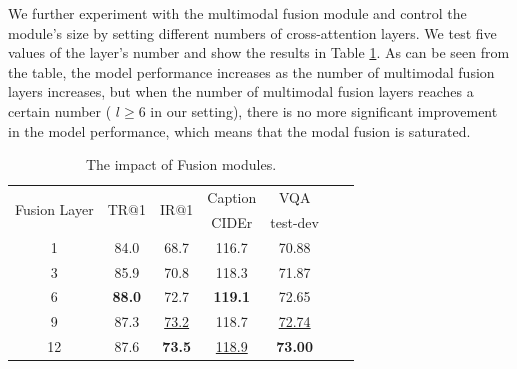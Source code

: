 \documentclass[10pt,twocolumn,letterpaper]{article}
\begin{document}
We further experiment with the multimodal fusion module and control the module's size by setting different numbers of cross-attention layers. 
We test five values of the layer's number and show the results in Table \ref{abl_fusion}. 
As can be seen from the table, the model performance increases as the number of multimodal fusion layers increases, but when the number of multimodal fusion layers reaches a certain number ( $ l \geq 6 $ in our setting), there is no more significant improvement in the model performance, which means that the modal fusion is saturated. 

\begin{center}
\end{center}


\begin{table}[t]
  \caption{The impact of Fusion modules.}
  \label{abl_fusion}
    \vspace{10.0pt}
  \begin{center}
  \begin{small}
  \renewcommand\arraystretch{1.2}
  \setlength{\tabcolsep}{2.2mm}
   \begin{tabular}{c|cccccc}
    \toprule 
    \multirow{2}{1.6cm}{\centering Fusion Layer}  &  \multirow{2}{0.7cm}{TR$@$1}  & \multirow{2}{0.7cm}{IR$@$1}  &  \multicolumn{1}{c}{Caption} & \multicolumn{1}{c}{VQA} \\
      &  & & CIDEr & test-dev   \\
    \midrule
    1     &  84.0 & 68.7 & 116.7 & 70.88  \\
    3     &  85.9 & 70.8 & 118.3 & 71.87  \\
    6     &  \textbf{88.0} & 72.7 & \textbf{119.1} & 72.65  \\
    9     &  87.3 & \underline{73.2} & 118.7 & \underline{72.74}  \\
    12    &  87.6 & \textbf{73.5} & \underline{118.9} & \textbf{73.00}  \\
  \bottomrule
  \end{tabular}
  \end{small}
  \end{center}
  \vskip -0.3in
\end{table}
\end{document}
